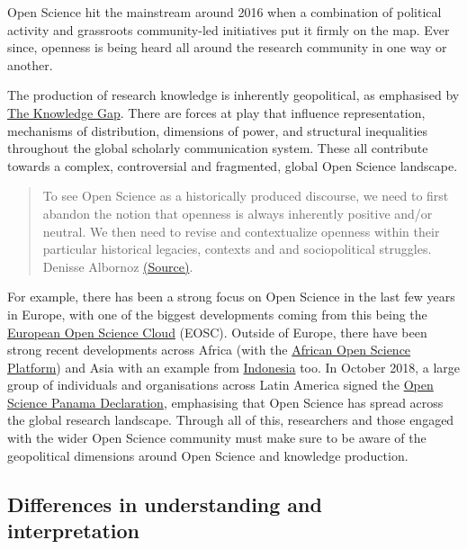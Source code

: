\documentclass[]{book}
\begin{document}
{{Open Science hit the mainstream around 2016 when a combination of political activity and grassroots community-led initiatives put it firmly on the map. Ever since, openness is being heard all around the research community in one way or another.

The production of research knowledge is inherently geopolitical, as emphasised by \href{http://knowledgegap.org/}{The Knowledge Gap}. There are forces at play that influence representation, mechanisms of distribution, dimensions of power, and structural inequalities throughout the global scholarly communication system. These all contribute towards a complex, controversial and fragmented, global Open Science landscape.

\begin{quote}
To see Open Science as a historically produced discourse, we need to first abandon the notion that openness is always inherently positive and/or neutral. We then need to revise and contextualize openness within their particular historical legacies, contexts and and sociopolitical struggles. Denisse Albornoz \href{https://medium.com/@denalbz/power-and-inequality-in-open-science-discourses-9d425b0c2b63}{(Source)}.
\end{quote}

For example, there has been a strong focus on Open Science in the last few years in Europe, with one of the biggest developments coming from this being the \href{http://ec.europa.eu/research/openscience/index.cfm?pg=open-science-cloud}{European Open Science Cloud} (EOSC). Outside of Europe, there have been strong recent developments across Africa (with the \href{http://africanopenscience.org.za/}{African Open Science Platform}) and Asia with an example from \href{https://blogs.openaire.eu/?p=3105}{Indonesia} too. In October 2018, a large group of individuals and organisations across Latin America signed the \href{http://openaccessweek.org/profiles/blogs/open-scicence-panama-declaration-latin-america-going-beyond-open}{Open Science Panama Declaration}, emphasising that Open Science has spread across the global research landscape. Through all of this, researchers and those engaged with the wider Open Science community must make sure to be aware of the geopolitical dimensions around Open Science and knowledge production.

\hypertarget{differences-in-understanding-and-interpretation}{%
\subsection{Differences in understanding and interpretation }\label{differences-in-understanding-and-interpretation}}

}}
\end{document}
